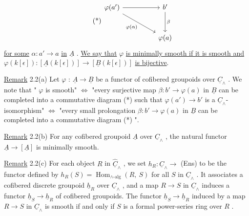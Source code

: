 \begin{equation}\tag{*}
\begin{tikzcd}[row sep=large, column sep=huge]
\varphi(a') \arrow[r] \arrow[dr, "\varphi(\alpha)"'] & b' \arrow[d, "\beta"] \\
 & \varphi(a)
\end{tikzcd}
\end{equation}
\underline{for some}  $\alpha : a' \longrightarrow a$  \underline{in}  $\underline{A}$ . \underline{We say that}  $\varphi$  \underline{is minimally smooth if it is smooth and}  $\varphi(k[\epsilon]) : [\underline{A}(k[\epsilon])] \longrightarrow [\underline{B}(k[\epsilon])]$  \underline{is bijective}.

\underline{Remark} 2.2(a)  Let  $\varphi$ : $\underline{A} \longrightarrow \underline{B}$  be a functor of cofibered groupoids over  $\underline{C}_\wedge$ . We note that  " $\varphi$  is smooth" $\Leftrightarrow$ "every surjective map  $\beta : b' \longrightarrow \varphi(a)$  in  $\underline{B}$ can be completed into a commutative diagram (*) such that  $\varphi(a') \longrightarrow b'$  is a $\underline{C}_\wedge$-isomorphism"  $\Leftrightarrow$  "every small prolongation  $\beta : b' \longrightarrow \varphi(a)$  in  $\underline{B}$  can be completed into a commutative diagram (*) ".

\underline{Remark} 2.2(b)  For any cofibered groupoid  $\underline{A}$  over  $\underline{C}_\wedge$ , the natural functor $\underline{A} \longrightarrow [\underline{A}]$  is minimally smooth.

\underline{Remark} 2.2(c)  For each object  $R$  in  $\hat{\underline{C}}_\wedge$ , we set  $h_R : \underline{C}_\wedge \longrightarrow$ (Ens)  to be the functor defined by  $h_R(S) = \operatorname{Hom}_{\wedge\text{-alg}}(R,\ S)$  for all  $S$  in  $\underline{C}_\wedge$ . It associates a cofibered discrete groupoid  $\underline{h}_R$  over  $\underline{C}_\wedge$ , and a map  $R \longrightarrow S$  in  $\underline{C}_\wedge$
induces a functor  $\underline{h}_S \longrightarrow \underline{h}_R$  of cofibered groupoids. The functor  $\underline{h}_S \longrightarrow \underline{h}_R$  induced by a map  $R \longrightarrow S$  in  $\underline{C}_\wedge$  is smooth if and only if  $S$  is a formal power-series ring over  $R$ .

